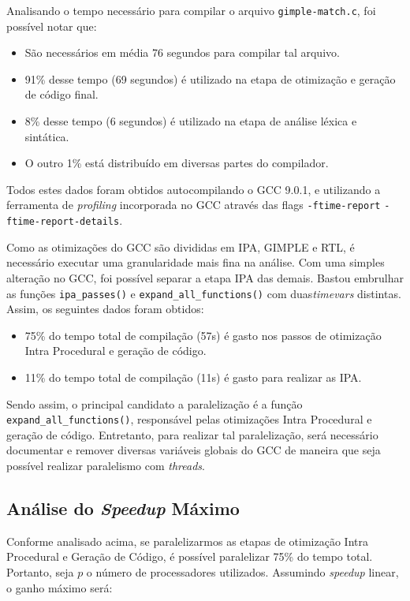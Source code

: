 Analisando o tempo necessário para compilar o arquivo \texttt{gimple-match.c},
foi possível notar que:
\begin{itemize}
    \item São necessários em média 76 segundos para compilar tal arquivo.

    \item 91\% desse tempo (69 segundos) é utilizado na etapa de otimização
        e geração de código final.

    \item 8\% desse tempo (6 segundos) é utilizado na etapa de análise léxica
        e sintática.

    \item O outro 1\% está distribuído em diversas partes do compilador.
\end{itemize}
Todos estes dados foram obtidos autocompilando o GCC 9.0.1, e utilizando a
ferramenta de \textit{profiling} incorporada
no GCC através das flags \texttt{-ftime-report} \texttt{-ftime-report-details}.

Como as otimizações do GCC são divididas em IPA, GIMPLE e RTL, é necessário
executar uma granularidade mais fina na análise. Com uma simples alteração
no GCC, foi possível separar a etapa IPA das demais. Bastou embrulhar as funções
\texttt{ipa\_passes()} e \texttt{expand\_all\_functions()} com duas\textit{timevars}
distintas. Assim, os seguintes dados foram obtidos:
\begin{itemize}
    \item 75\% do tempo total de compilação (57s) é gasto nos passos de otimização
        Intra Procedural e geração de código.

    \item 11\% do tempo total de compilação (11s) é gasto para realizar as IPA.
\end{itemize}
Sendo assim, o principal candidato a paralelização é a função \texttt{expand\_all\_functions()},
responsável pelas otimizações Intra Procedural e geração de código.
Entretanto, para realizar tal paralelização, será necessário documentar e remover diversas
variáveis globais do GCC de maneira que seja possível realizar paralelismo com \textit{threads}.

\subsection{Análise do \textit{Speedup} Máximo}

Conforme analisado acima, se paralelizarmos as etapas de otimização Intra
Procedural e Geração de Código, é possível paralelizar 75\% do tempo total.
Portanto, seja $p$ o número de processadores utilizados. Assumindo
\textit{speedup} linear, o ganho máximo será:


